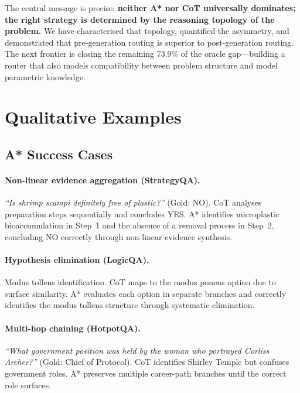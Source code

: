 \documentclass[11pt]{article}
\begin{document}
\noindent The central message is precise: \textbf{neither A* nor CoT universally dominates; the right strategy is determined by the reasoning topology of the problem.} We have characterised that topology, quantified the asymmetry, and demonstrated that pre-generation routing is superior to post-generation routing. The next frontier is closing the remaining 73.9\% of the oracle gap---building a router that also models compatibility between problem structure and model parametric knowledge.




\newpage
\appendix

\section{Qualitative Examples}
\label{app:qualitative}

\subsection{A* Success Cases}

\paragraph{Non-linear evidence aggregation (StrategyQA).}
\emph{``Is shrimp scampi definitely free of plastic?''} (Gold: NO). CoT analyses preparation steps sequentially and concludes YES. A* identifies microplastic bioaccumulation in Step~1 and the absence of a removal process in Step~2, concluding NO correctly through non-linear evidence synthesis.

\paragraph{Hypothesis elimination (LogicQA).}
Modus tollens identification. CoT maps to the modus ponens option due to surface similarity. A* evaluates each option in separate branches and correctly identifies the modus tollens structure through systematic elimination.

\paragraph{Multi-hop chaining (HotpotQA).}
\emph{``What government position was held by the woman who portrayed Corliss Archer?''} (Gold: Chief of Protocol). CoT identifies Shirley Temple but confuses government roles. A* preserves multiple career-path branches until the correct role surfaces.
\end{document}
